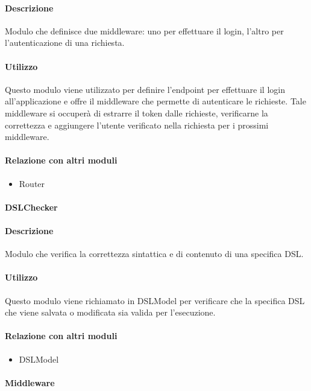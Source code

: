 \paragraph*{Descrizione}
Modulo che definisce due middleware: uno per effettuare il login, l'altro per l'autenticazione di una richiesta.

\paragraph*{Utilizzo}
Questo modulo viene utilizzato per definire l'endpoint per effettuare il login all'applicazione e offre il middleware che permette di autenticare le richieste. Tale middleware si occuperà di estrarre il token dalle richieste, verificarne la correttezza e aggiungere l'utente verificato nella richiesta per i prossimi middleware.

\paragraph*{Relazione con altri moduli}
\begin{itemize}
\item Router
\end{itemize}

\paragraph{DSLChecker}
\paragraph*{Descrizione}
Modulo che verifica la correttezza sintattica e di contenuto di una specifica DSL.

\paragraph*{Utilizzo}
Questo modulo viene richiamato in DSLModel per verificare che la specifica DSL che viene salvata o modificata sia valida per l'esecuzione.

\paragraph*{Relazione con altri moduli}
\begin{itemize}
\item DSLModel
\end{itemize}

\paragraph{Middleware}

